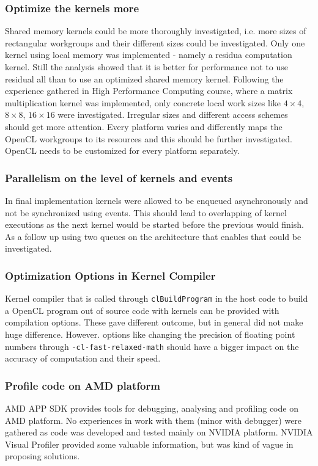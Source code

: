 \subsubsection{Optimize the kernels more}
Shared memory kernels could be more thoroughly investigated, i.e. more sizes of rectangular workgroups and their different sizes could be investigated. Only one kernel using local memory was implemented - namely a residua computation kernel. Still the analysis showed that it is better for performance not to use residual all than to use an optimized shared memory kernel. Following the experience gathered in High Performance Computing course, where a matrix multiplication kernel was implemented, only concrete local work sizes like $4\times4$, $8\times8$, $16\times16$ were investigated. Irregular sizes and different access schemes should get more attention. Every platform varies and differently maps the OpenCL workgroups to its resources and this should be further investigated. OpenCL needs to be customized for every platform separately. 

\subsubsection{Parallelism on the level of kernels and events}
In final implementation kernels were allowed to be enqueued asynchronously and not be synchronized using events. This should lead to overlapping of kernel executions as the next kernel would be started before the previous would finish. As a follow up using two queues on the architecture that enables that could be investigated.

\subsubsection{Optimization Options in Kernel Compiler}
Kernel compiler that is called through \texttt{clBuildProgram} in the host code to build a OpenCL program out of source code with kernels can be provided with compilation options. These gave different outcome, but in general did not make huge difference. However. options like changing the precision of floating point numbers through \texttt{-cl-fast-relaxed-math} should have a bigger impact on the accuracy of computation and their speed.

\subsubsection{Profile code on AMD platform}
AMD APP SDK provides tools for debugging, analysing and profiling code on AMD platform. No  experiences in work with them (minor with debugger) were gathered as code was developed and tested mainly on NVIDIA platform. NVIDIA Visual Profiler provided some valuable information, but was kind of vague in proposing solutions.

